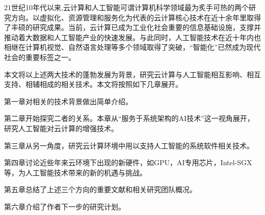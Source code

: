 
\begin{cabstract}
	21世纪10年代以来,云计算和人工智能可谓计算机科学领域最为炙手可热的两个研究方向。以虚拟化、资源管理和服务化为代表的云计算核心技术在近十余年里取得了丰硕的研究成果。当前，云计算已成为工业化社会重要的信息基础设施，支撑并推动着大数据和人工智能产业的快速发展。与此同时，人工智能技术在近十年内也相继在计算机视觉、自然语言处理等多个领域取得了突破，“智能化”已然成为现代社会的重要标签之一。
	
	本文将以上述两大技术的蓬勃发展为背景，研究云计算与人工智能相互影响、相互支持、相辅相成的相关技术。本文将按照如下几章展开。
	
	第一章对相关的技术背景做出简单介绍。
	
	第二章开始探究二者的关系。本章从“服务于系统架构的AI技术”这一视角展开，研究人工智能对云计算的增强技术。
	
	第三章从另一角度，研究云计算环境中用以支持人工智能的系统软件相关技术。
	
	第四章讨论近些年来云环境下出现的新硬件，如GPU，AI专用芯片，Intel-SGX等，为人工智能技术带来的新的机遇与挑战。
	
	第五章总结了上述三个方向的重要文献和相关研究团队概况。
	
	第六章介绍了作者下一步的研究计划。

\end{cabstract}


